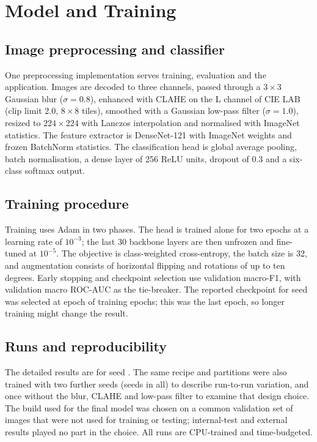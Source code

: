\section{Model and Training}\label{sec:method}
\subsection{Image preprocessing and classifier}
One preprocessing implementation serves training, evaluation and the application. Images are decoded to
three channels, passed through a $3{\times}3$ Gaussian blur ($\sigma{=}0.8$), enhanced with CLAHE
\cite{pizer1987adaptive} on the L channel of CIE LAB (clip limit 2.0, $8{\times}8$ tiles), smoothed with
a Gaussian low-pass filter ($\sigma{=}1.0$), resized to $224{\times}224$ with Lanczos interpolation and
normalised with ImageNet statistics. The feature extractor is DenseNet-121 \cite{huang2017densely} with
ImageNet weights \cite{deng2009imagenet} and frozen BatchNorm statistics. The classification head is
global average pooling, batch normalisation, a dense layer of 256 ReLU units, dropout of 0.3 and a
six-class softmax output.

\subsection{Training procedure}
Training uses Adam \cite{kingma2015adam} in two phases. The head is trained alone for two epochs at a
learning rate of $10^{-3}$; the last 30 backbone layers are then unfrozen and fine-tuned at $10^{-5}$.
The objective is class-weighted cross-entropy, the batch size is 32, and augmentation consists of
horizontal flipping and rotations of up to ten degrees. Early stopping and checkpoint selection use
validation macro-F1, with validation macro ROC-AUC as the tie-breaker. The reported checkpoint for seed
\RSeed{} was selected at epoch \RSelectedEpoch{} of \REpochsTrained{} training epochs; this was the last
epoch, so longer training might change the result.

\subsection{Runs and reproducibility}
The detailed results are for seed \RSeed. The same recipe and partitions were also trained with two
further seeds (seeds \RMSSeeds{} in all) to describe run-to-run variation, and once without the blur, CLAHE
and low-pass filter to examine that design choice. The build used for the final model was chosen on a
common validation set of \RCmpN{} images that were not used for training or testing; internal-test and
external results played no part in the choice. All runs are CPU-trained and time-budgeted.
